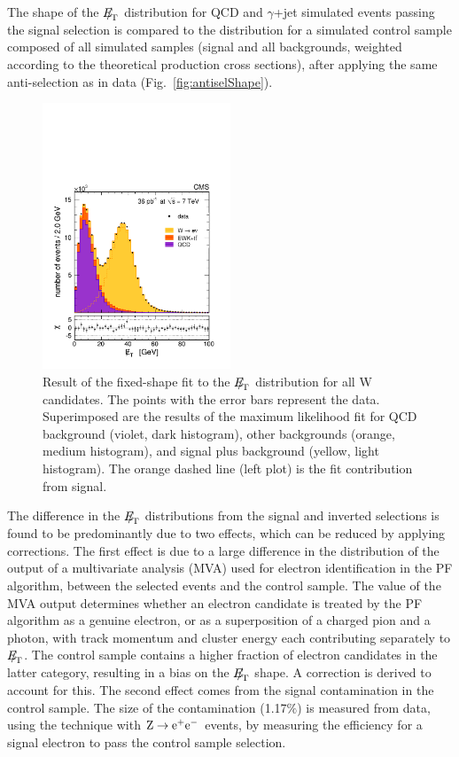 The shape of the ${E\!\!\!/}_{\!\mathrm{T}}$ distribution for QCD and $\gamma$+jet simulated 
events passing the signal selection is compared 
to the \MET distribution for a simulated control sample composed of all simulated samples (signal and 
all backgrounds, weighted according to the 
theoretical production cross sections), after applying the same anti-selection 
as in data (Fig.~\ref{fig:antiselShape}).

\begin{figure}[htb]
  \begin{center}
    \includegraphics*[width=0.5\textwidth]{figs/Wenu_pfMET_lin.pdf}
    \caption{Result of the fixed-shape fit to the ${E\!\!\!/}_{\!\mathrm{T}}$ distribution for all W candidates.
The points with the error bars represent the data.   Superimposed are the results
of the maximum likelihood fit for QCD background (violet, dark histogram), other backgrounds
(orange, medium histogram), and signal plus  background (yellow, light histogram).
The orange dashed line (left plot) is the fit contribution from signal.
}
    \label{fig:resultAll}
  \end{center}
\end{figure}

The difference in the ${E\!\!\!/}_{\!\mathrm{T}}$ distributions from the signal and inverted selections
is found to be predominantly due to two effects, which can be reduced by applying corrections.
The first effect is due to a large difference in the distribution of the output of a multivariate 
analysis (MVA) used for electron identification in the PF algorithm, between the selected events 
and the control sample. The value of the MVA output determines whether an electron candidate 
is treated by the PF algorithm as a genuine electron, or as a superposition of a charged pion and 
a photon, with track momentum and cluster energy each contributing separately to ${E\!\!\!/}_{\!\mathrm{T}}$. The control 
sample contains a higher fraction of electron candidates in the latter category, resulting in a bias on 
the ${E\!\!\!/}_{\!\mathrm{T}}$ shape. A correction is derived to account for this.
The second effect comes from the signal 
contamination in the control sample. The size of the contamination (1.17$\%$) is 
measured from data, using the \TNP technique with $\mathrm{Z} \rightarrow \mathrm{e}^+\mathrm{e}^-$  
events, by measuring the efficiency for a signal electron to pass the 
control sample selection.


